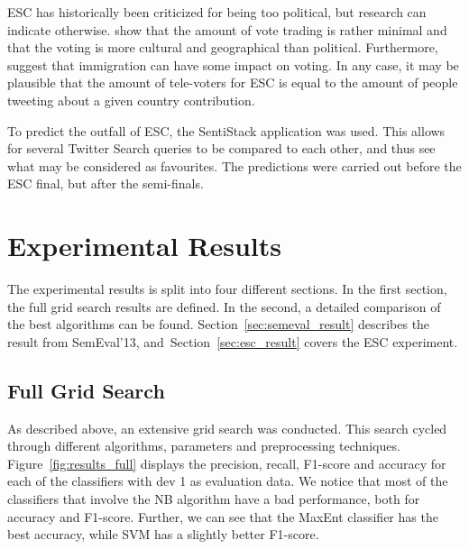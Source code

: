 ESC has historically been criticized for being too political, but research can indicate otherwise. \cite{ginsburgh2008eurovision} show that the amount of vote trading is rather minimal and that the voting is more cultural and geographical than political. Furthermore, \cite{ginsburgh2008eurovision} suggest that immigration can have some impact on voting. In any case, it may be plausible that the amount of tele-voters for ESC is equal to the amount of people tweeting about a given country contribution.

To predict the outfall of ESC, the SentiStack application was used. This allows for several Twitter Search queries to be compared to each other, and thus see what may be considered as favourites. The predictions were carried out before the ESC final, but after the semi-finals.  

%


\chapter{Experimental Results}
\label{sec:results}


The experimental results is split into four different sections. In the first section, the full grid search results are defined. In the second, a detailed comparison of the best algorithms can be found. Section~\ref{sec:semeval_result} describes the result from SemEval'13, and~Section~\ref{sec:esc_result} covers the ESC experiment.

\section{Full Grid Search}

As described above, an extensive grid search was conducted. This search cycled through different algorithms, parameters and preprocessing techniques. Figure~\ref{fig:results_full} displays the precision, recall, F1-score and accuracy for each of the classifiers with dev 1 as evaluation data. We notice that most of the classifiers that involve the NB algorithm have a bad performance, both for accuracy and F1-score. Further, we can see that the MaxEnt classifier has the best accuracy, while SVM has a slightly better F1-score.

